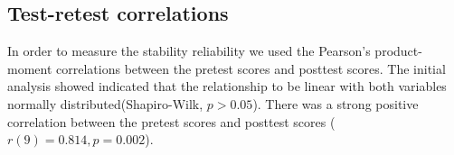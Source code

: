 \subsection*{Test-retest correlations}\label{sec:testretest}
In order to measure the stability reliability we used the Pearson's product-moment correlations between the pretest scores and posttest scores. The initial analysis showed indicated that the relationship to be linear with both variables normally distributed(Shapiro-Wilk, $p > 0.05$). 
There was a strong positive correlation between the pretest scores and posttest scores ($r(9) = 0.814, p = 0.002$).
